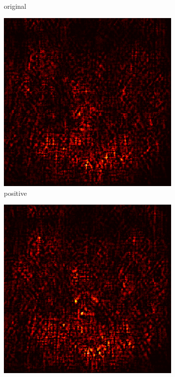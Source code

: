 \documentclass[preprint,12pt]{elsarticle}
\begin{document}
\begin{figure}
\begin{subfigure}{0.14\linewidth}
        \caption{original}
    \end{subfigure}
    \hfill
    \begin{subfigure}{0.14\textwidth}
        \centering
        \includegraphics[width=\linewidth]{../visualizations/examples/imagenette/resnet18/positive_saliency_map/6.png}
        \caption{positive}
    \end{subfigure}
    \hfill
    \begin{subfigure}{0.14\textwidth}
        \centering
        \includegraphics[width=\linewidth]{../visualizations/examples/imagenette/resnet18/negative_saliency_map/6.png}

\end{subfigure}
\end{figure}
\end{document}
